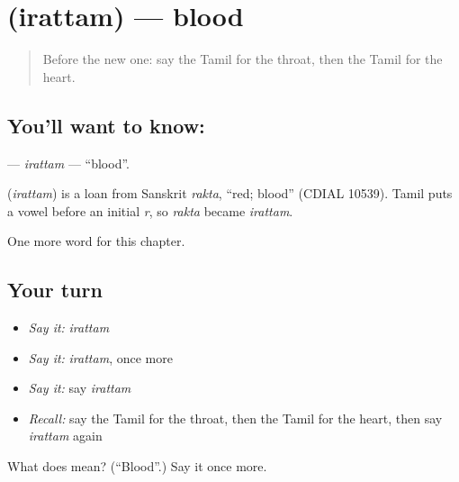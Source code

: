\section[\texorpdfstring{\ta{இரத்தம்} (irattam)}{இரத்தம் (irattam)}]{ (irattam) — blood}

\label{lesson:TA-C169-irattam}



\begin{quote}
Before the new one: say the Tamil for the throat, then the Tamil for the heart.
\end{quote}

\subsection*{You'll want to know: }
\textbf{} — \emph{irattam} — \textquotedblleft{}blood\textquotedblright{}.

\begin{cousinweb}
\textbf{} (\emph{irattam}) is a loan from Sanskrit \emph{rakta}, \textquotedblleft{}red; blood\textquotedblright{} (CDIAL 10539). Tamil puts a vowel before an initial \emph{r}, so \emph{rakta} became \emph{irattam}.
\end{cousinweb}

\begin{grammarlens}[title={What you've built}]
One more word for this chapter.
\end{grammarlens}

\subsection*{Your turn}
\begin{itemize}
\raggedright
  \item \emph{Say it:} \emph{irattam}
  \item \emph{Say it:} \emph{irattam}, once more
  \item \emph{Say it:} say \emph{irattam}
  \item \emph{Recall:} say the Tamil for the throat, then the Tamil for the heart, then say \emph{irattam} again
\end{itemize}

\begin{tcolorbox}[breakable,colback=teal!4,colframe=teal!35!black,title={Before you move on}]
What does  mean? (\textquotedblleft{}Blood\textquotedblright{}.) Say it once more.
\end{tcolorbox}
